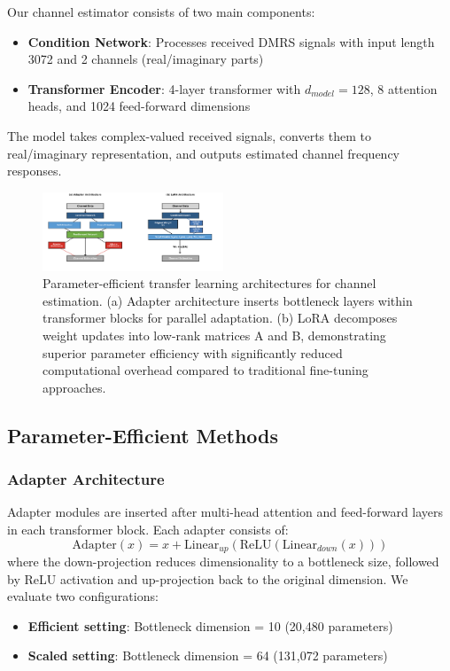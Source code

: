 \documentclass[conference]{IEEEtran}
\begin{document}
Our channel estimator consists of two main components:
\begin{itemize}
\item \textbf{Condition Network}: Processes received DMRS signals with input length 3072 and 2 channels (real/imaginary parts)
\item \textbf{Transformer Encoder}: 4-layer transformer with $d_{model}=128$, 8 attention heads, and 1024 feed-forward dimensions
\end{itemize}

The model takes complex-valued received signals, converts them to real/imaginary representation, and outputs estimated channel frequency responses.

\begin{figure}[t]
\centering
\includegraphics[width=0.48\textwidth]{figures/architecture_comparison_new.pdf}
\caption{Parameter-efficient transfer learning architectures for channel estimation. (a) Adapter architecture inserts bottleneck layers within transformer blocks for parallel adaptation. (b) LoRA decomposes weight updates into low-rank matrices A and B, demonstrating superior parameter efficiency with significantly reduced computational overhead compared to traditional fine-tuning approaches.}
\label{fig:architecture}
\end{figure}

\subsection{Parameter-Efficient Methods}

\subsubsection{Adapter Architecture}
Adapter modules are inserted after multi-head attention and feed-forward layers in each transformer block. Each adapter consists of:
\begin{equation}
\text{Adapter}(x) = x + \text{Linear}_{up}(\text{ReLU}(\text{Linear}_{down}(x)))
\end{equation}
where the down-projection reduces dimensionality to a bottleneck size, followed by ReLU activation and up-projection back to the original dimension. We evaluate two configurations:
\begin{itemize}
\item \textbf{Efficient setting}: Bottleneck dimension = 10 (20,480 parameters)
\item \textbf{Scaled setting}: Bottleneck dimension = 64 (131,072 parameters)
\end{itemize}
\end{document}
